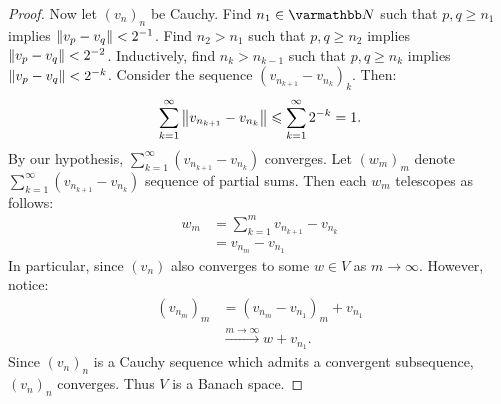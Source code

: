 \begin{proof}
            Now let $(v_n)_n$ be Cauchy. Find $n_1 \in \bfN$ such that $p,q \geq n_1$ implies $\left\lVert v_p - v_q \right\rVert < 2^{-1}$. Find $n_2 > n_1$ such that $p,q \geq n_2$ implies $\left\lVert v_p - v_q \right\rVert < 2^{-2}$. Inductively, find $n_k > n_{k-1}$ such that $p,q \geq n_k$ implies $\left\lVert v_p - v_q \right\rVert < 2^{-k}$. Consider the sequence $(v_{n_{k+1}} - v_{n_k})_k$. Then:
                \begin{equation*}
                \begin{split}
                    \sum_{k = 1}^\infty \left\lVert v_{n_{k+1}} - v_{n_k} \right\rVert \leqslant \sum_{k = 1}^\infty 2^{-k} = 1.
                \end{split}
                \end{equation*}
            By our hypothesis, $\sum_{k = 1}^\infty (v_{n_{k+1}} - v_{n_k})$ converges. Let $(w_m)_m$ denote $\sum_{k = 1}^\infty (v_{n_{k+1}} - v_{n_k})$ sequence of partial sums. Then each $w_m$ telescopes as follows:
                \begin{equation*}
                \begin{split}
                    w_m 
                    & = \sum_{k = 1}^m v_{n_{k+1}} - v_{n_k} \\
                    & = v_{n_m} - v_{n_1}
                \end{split}
                \end{equation*}
            In particular, since $(v_n)$
            also converges to some $w \in V$ as $m \rightarrow \infty$. However, notice:
                \begin{equation*}
                \begin{split}
                    (v_{n_m})_m 
                    & = (v_{n_m} - v_{n_1})_m + v_{n_1} \\
                    & \xrightarrow{m \rightarrow \infty} w + v_{n_1}.
                \end{split}
                \end{equation*}
            Since $(v_n)_n$ is a Cauchy sequence which admits a convergent subsequence, $(v_n)_n$ converges. Thus $V$ is a Banach space.
        \end{proof}

